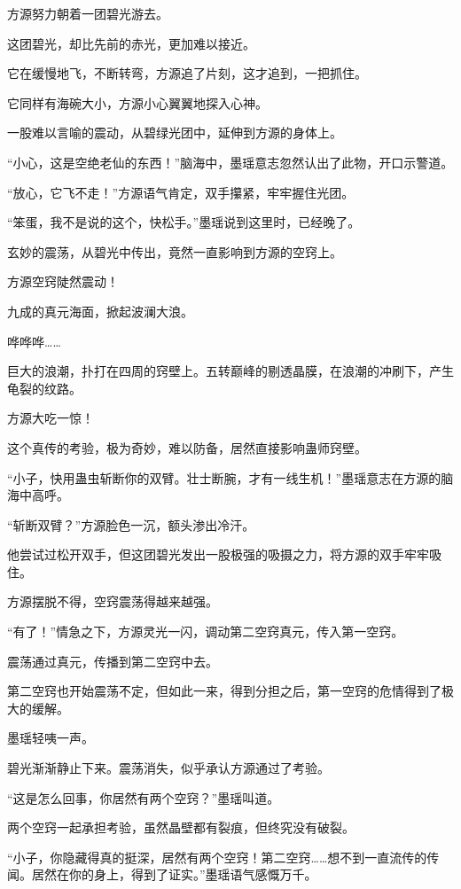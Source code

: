 
\begin{this_body}

方源努力朝着一团碧光游去。

这团碧光，却比先前的赤光，更加难以接近。

它在缓慢地飞，不断转弯，方源追了片刻，这才追到，一把抓住。

它同样有海碗大小，方源小心翼翼地探入心神。

一股难以言喻的震动，从碧绿光团中，延伸到方源的身体上。

“小心，这是空绝老仙的东西！”脑海中，墨瑶意志忽然认出了此物，开口示警道。

“放心，它飞不走！”方源语气肯定，双手攥紧，牢牢握住光团。

“笨蛋，我不是说的这个，快松手。”墨瑶说到这里时，已经晚了。

玄妙的震荡，从碧光中传出，竟然一直影响到方源的空窍上。

方源空窍陡然震动！

九成的真元海面，掀起波澜大浪。

哗哗哗……

巨大的浪潮，扑打在四周的窍壁上。五转巅峰的剔透晶膜，在浪潮的冲刷下，产生龟裂的纹路。

方源大吃一惊！

这个真传的考验，极为奇妙，难以防备，居然直接影响蛊师窍壁。

“小子，快用蛊虫斩断你的双臂。壮士断腕，才有一线生机！”墨瑶意志在方源的脑海中高呼。

“斩断双臂？”方源脸色一沉，额头渗出冷汗。

他尝试过松开双手，但这团碧光发出一股极强的吸摄之力，将方源的双手牢牢吸住。

方源摆脱不得，空窍震荡得越来越强。

“有了！”情急之下，方源灵光一闪，调动第二空窍真元，传入第一空窍。

震荡通过真元，传播到第二空窍中去。

第二空窍也开始震荡不定，但如此一来，得到分担之后，第一空窍的危情得到了极大的缓解。

墨瑶轻咦一声。

碧光渐渐静止下来。震荡消失，似乎承认方源通过了考验。

“这是怎么回事，你居然有两个空窍？”墨瑶叫道。

两个空窍一起承担考验，虽然晶壁都有裂痕，但终究没有破裂。

“小子，你隐藏得真的挺深，居然有两个空窍！第二空窍……想不到一直流传的传闻。居然在你的身上，得到了证实。”墨瑶语气感慨万千。


\end{this_body}

